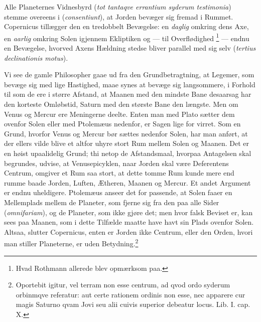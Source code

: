 \documentclass[12pt,a4paper]{book}
\renewcommand{\thefootnote}{*)}
\begin{document}
Alle Planeternes Vidnesbyrd (\textit{tot tantaqve errantium syderum
testimonia}) stemme overeens i (\textit{consentiunt}), at Jorden
bevæger sig fremad i Rummet. Copernicus tillægger den en tredobbelt
Bevægelse: en \emph{daglig} omkring dens Axe, en \emph{aarlig} omkring
Solen igjennem Ekliptiken og --- til Overflødighed%
\renewcommand{\thefootnote}{**)}%
\footnote{%
Hvad Rothmann allerede blev opmærksom paa.}%
\renewcommand{\thefootnote}{*)}
--- endnu en Bevægelse, hvorved Axens Hældning stedse bliver parallel
med sig selv (\textit{tertius declinationis motus}).

Vi see de gamle Philosopher gaae ud fra den Grundbetragtning, at
Legemer, som bevæge sig med lige Hastighed, maae synes at bevæge sig
langsommere, i Forhold til som de ere i større Afstand, at Maanen med
den mindste Bane desaarsag har den korteste Omløbstid, Saturn med den
største Bane den længste. Men om Venus og Mercur ere Meningerne deelte.
Enten man med Plato sætter dem ovenfor Solen eller med Ptolemæus
nedenfor, er Sagen lige for\-%
virret. Som en Grund, hvorfor Venus og Mercur bør sættes nedenfor
Solen, har man anført, at der ellers vilde blive et altfor uhyre stort
Rum mellem Solen og Maanen. Det er en høist upaalidelig Grund; thi
netop de Afstandsmaal, hvorpaa Antagelsen skal begrundes, udvise, at
Venusepicyklen, naar Jorden skal være Deferentens Centrum, omgiver et
Rum saa stort, at dette tomme Rum kunde mere end rumme baade Jorden,
Luften, Ætheren, Maanen og Mercur. Et andet Argument er endnu
uheldigere. Ptolemæus anseer det for passende, at Solen faaer en
Mellemplads mellem de Planeter, som fjerne sig fra den paa alle Sider
(\textit{omnifariam}), og de Planeter, som ikke gjøre det; men hvor
falsk Beviset er, kan sees paa Maanen, som i dette Tilfælde maatte have
havt sin Plads ovenfor Solen. Altsaa, slutter Copernicus, enten er
Jorden ikke Centrum, eller den Orden, hvori man stiller Planeterne, er
uden Betydning.\footnote{%
Oportebit igitur, vel terram non esse centrum, ad qvod ordo syderum
orbinmqve referatur: aut certe rationem ordinis non esse, nec apparere
cur magis Saturno qvam Jovi seu alii cuivis superior debeatur locus.
Lib. I. cap. X.}
\end{document}
